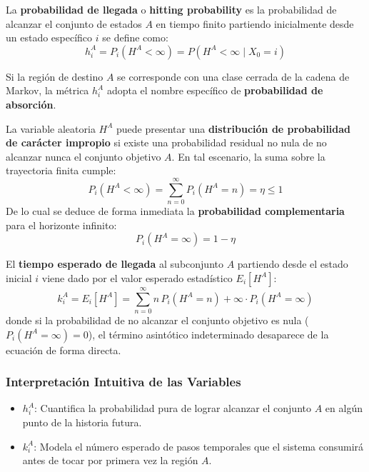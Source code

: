 \documentclass[10pt]{book}
\newcommand{\tbf}{\textbf}
\begin{document}
\begin{definicion}
    La \tbf{probabilidad de llegada} o \textbf{hitting probability} es la probabilidad de alcanzar el conjunto de estados $A$ en tiempo finito partiendo inicialmente desde un estado específico $i$ se define como:
    \[ 
    h_i^A = P_i(H^A < \infty) = P(H^A < \infty \mid X_0 = i) 
    \]
\end{definicion}

\begin{observacion}
    Si la región de destino $A$ se corresponde con una clase cerrada de la cadena de Markov, la métrica $h_i^A$ adopta el nombre específico de \textbf{probabilidad de absorción}.
\end{observacion}

\begin{definicion}
    La variable aleatoria $H^A$ puede presentar una \tbf{distribución de probabilidad de carácter impropio} si existe una probabilidad residual no nula de no alcanzar nunca el conjunto objetivo $A$. En tal escenario, la suma sobre la trayectoria finita cumple:
    \[
    P_i(H^A < \infty) = \sum_{n=0}^{\infty} P_i(H^A = n) = \eta \leq 1
    \]
    De lo cual se deduce de forma inmediata la \tbf{probabilidad complementaria} para el horizonte infinito:
    \[
    P_i(H^A = \infty) = 1 - \eta
    \]
\end{definicion}

\begin{definicion}
    El \textbf{tiempo esperado de llegada} al subconjunto $A$ partiendo desde el estado inicial $i$ viene dado por el valor esperado estadístico $E_i[H^A]$:
    \[ 
    k_i^A = E_i[H^A] = \sum_{n=0}^{\infty} n \, P_i(H^A = n) + \infty \cdot P_i(H^A = \infty) 
    \]
    donde si la probabilidad de no alcanzar el conjunto objetivo es nula ($P_i(H^A = \infty) = 0$), el término asintótico indeterminado desaparece de la ecuación de forma directa.
\end{definicion}

\subsubsection*{Interpretación Intuitiva de las Variables}
\begin{itemize}
    \item $h_i^A$: Cuantifica la probabilidad pura de lograr alcanzar el conjunto $A$ en algún punto de la historia futura.
    \item $k_i^A$: Modela el número esperado de pasos temporales que el sistema consumirá antes de tocar por primera vez la región $A$.
\end{itemize}
\end{document}
